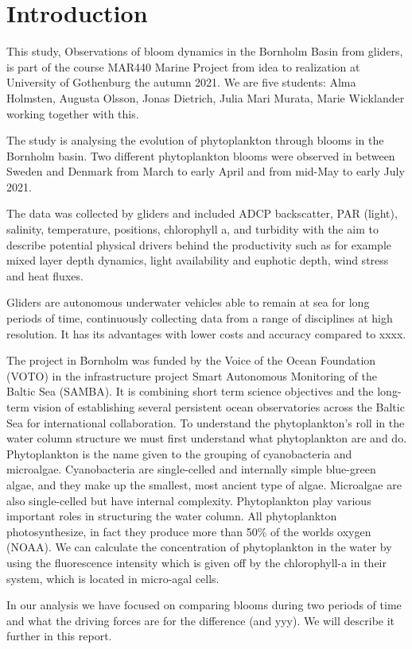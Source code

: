 \documentclass[../Main.tex]{subfiles}
\begin{document}
\section*{\crule[blue]{.3cm}{.3cm} Introduction}
This study, Observations of bloom dynamics in the Bornholm Basin from gliders,  
 is part of the course MAR440 Marine Project from idea to realization at University of Gothenburg the autumn 2021. We are five students: Alma Holmsten, Augusta Olsson, Jonas Dietrich, Julia Mari Murata, Marie Wicklander working together with this.

The study is analysing the evolution of phytoplankton through blooms in the Bornholm basin. Two different phytoplankton blooms were observed in between Sweden and Denmark from March to early April and from mid-May to early July 2021. 

The data was collected by gliders and included ADCP backscatter, PAR (light), salinity, temperature, positions, chlorophyll a, and turbidity with the aim to describe potential physical drivers behind the productivity such as for example mixed layer depth dynamics, light availability and euphotic depth, wind stress and heat fluxes. 

Gliders are autonomous underwater vehicles able to remain at sea for long periods of time, continuously collecting data from a range of disciplines at high resolution. It has its advantages with lower costs and accuracy compared to xxxx.

The project in Bornholm was funded by the Voice of the Ocean Foundation (VOTO) in the infrastructure project Smart Autonomous Monitoring of the Baltic Sea (SAMBA). It is combining short term science objectives and the long-term vision of establishing several persistent ocean observatories across the Baltic Sea for international collaboration.
To understand the phytoplankton’s roll in the water column structure we must first understand what phytoplankton are and do. Phytoplankton is the name given to the grouping of cyanobacteria and microalgae. Cyanobacteria are single-celled and internally simple blue-green algae, and they make up the smallest, most ancient type of algae. Microalgae are also single-celled but have internal complexity. Phytoplankton play various important roles in structuring the water column. All phytoplankton photosynthesize, in fact they produce more than 50\% of the worlds oxygen (NOAA). We can calculate the concentration of phytoplankton in the water by using the fluorescence intensity which is given off by the chlorophyll-a in their system, which is located in micro-agal cells.

In our analysis we have focused on comparing blooms during two periods of time and what the driving forces are for the difference (and yyy). We will describe it further in this report. 
\end{document}
